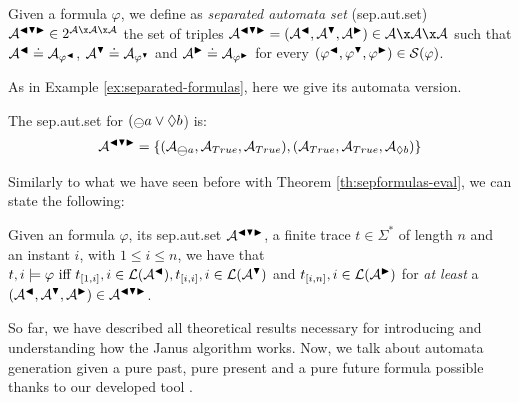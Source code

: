 \begin{definition}\citep{cecconi2018interestingness}\label{def:automaton-eval}
Given a \LTLp formula $\varphi$, we define as \emph{separated automata set} (sep.aut.set) $\automaton^{\blacktriangleleft \blacktriangledown \blacktriangleright} \in 2^{\automaton \x \automaton \x \automaton}$ the set of triples $\automaton^{\blacktriangleleft \blacktriangledown \blacktriangleright} = (\automaton^{\blacktriangleleft}, \automaton^{\blacktriangledown}, \automaton^{\blacktriangleright}) \in \automaton \x \automaton \x \automaton$ such that $\automaton^{\blacktriangleleft} \doteq \automaton_{\varphi^\blacktriangleleft}$, $\automaton^{\blacktriangledown} \doteq \automaton_{\varphi^\blacktriangledown}$ and $\automaton^{\blacktriangleright} \doteq \automaton_{\varphi^\blacktriangleright}$ for every $(\varphi^{\blacktriangleleft},\varphi^{\blacktriangledown},\varphi^{\blacktriangleright}) \in \S(\varphi)$.
\end{definition}
As in Example \ref{ex:separated-formulas}, here we give its automata version.
\begin{example}\label{ex:automata-sep-formulas}
The sep.aut.set for $(\Yesterday a \lOR \Diamond b$) is:
\begin{align*}
\automaton^{\blacktriangleleft \blacktriangledown \blacktriangleright} = \{(\automaton_{\Yesterday a}, \automaton_{True}, \automaton_{True}), (\automaton_{True}, \automaton_{True}, \automaton_{\Diamond b})\}
\end{align*}
\end{example}
Similarly to what we have seen before with Theorem \ref{th:sepformulas-eval}, we can state the following:

\begin{theorem}\citep{cecconi2018interestingness}\label{th:sepformulas-eval}
Given an \LTLp formula $\varphi$, its sep.aut.set $\automaton^{\blacktriangleleft \blacktriangledown \blacktriangleright}$, a finite trace $t \in \Sigma^*$ of length $n$ and an instant $i$, with $1 \le i \le n$, we have that $t,i \models \varphi \tiff t_{[1,i]}, i \in \L(\automaton^\blacktriangleleft), t_{[i,i]}, i \in \L(\automaton^\blacktriangledown)$ and $t_{[i,n]}, i \in \L(\automaton^\blacktriangleright)$ for \emph{at least} a $(\automaton^{\blacktriangleleft}, \automaton^{\blacktriangledown}, \automaton^{\blacktriangleright}) \in \automaton^{\blacktriangleleft \blacktriangledown \blacktriangleright}$.
\end{theorem}

So far, we have described all theoretical results necessary for introducing and understanding how the Janus algorithm works. Now, we talk about automata generation given a pure past, pure present and a pure future formula possible thanks to our developed tool \LTLfToDFA. 


